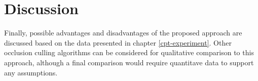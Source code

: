 \chapter{Discussion} \label{cpt-discussion}

Finally, possible advantages and disadvantages of the proposed approach are discussed based on the data
presented in chapter \ref{cpt-experiment}. Other occlusion culling algorithms can be considered for 
qualitative comparison to this approach, although a final comparison would require quantitave data to 
support any assumptions.\\






%
%
%
